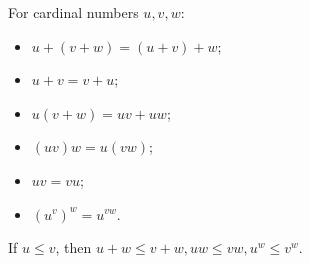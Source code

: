 For cardinal numbers \(u, v, w\):
\begin{itemize}
\item[(i)] \(u + (v + w) = (u + v) + w\);
\item[(ii)] \(u + v = v + u\);
\item[(iii)] \(u(v + w) = uv + uw\);
\item[(iv)] \((uv)w = u(vw)\);
\item[(v)] \(uv = vu\);
\item[(viii)] \((u^v)^w = u^{vw}\).
\end{itemize}
If \(u \leq v\), then \(u + w \leq v + w, uw \leq vw, u^w \leq v^w\).